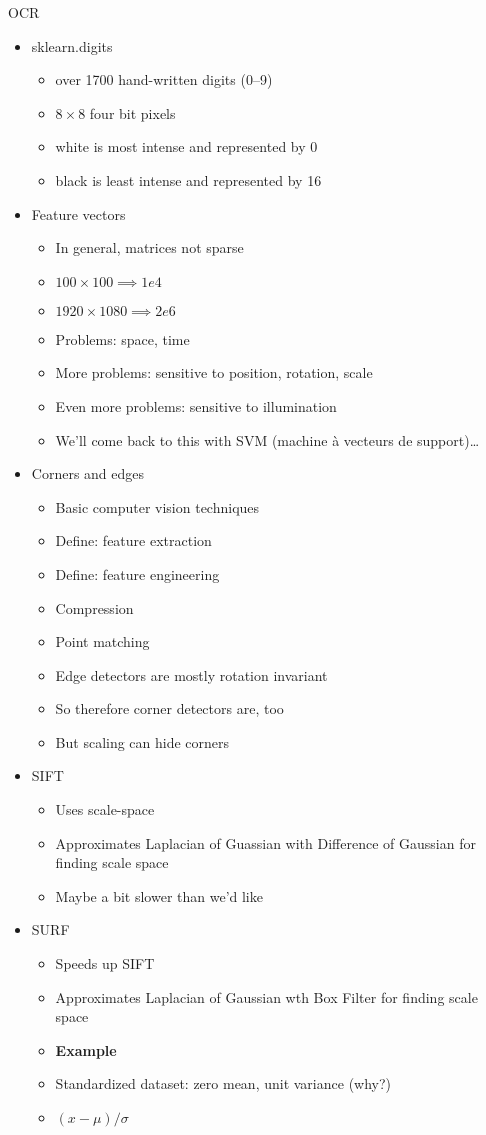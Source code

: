 \begin{itemize}
OCR
\begin{itemize}
\item sklearn.digits
  \begin{itemize}
  \item over 1700 hand-written digits (0--9)
  \item $8\times 8$ four bit pixels
  \item white is most intense and represented by 0
  \item black is least intense and represented by 16
  \end{itemize}
\item Feature vectors
  \begin{itemize}
  \item In general, matrices not sparse
  \item $100\times 100 \implies 1e4$
  \item $1920\times 1080 \implies 2e6$
  \item Problems: space, time
  \item More problems: sensitive to position, rotation, scale
  \item Even more problems: sensitive to illumination
  \item We'll come back to this with SVM (machine à vecteurs de support)\dots
  \end{itemize}
\item Corners and edges
  \begin{itemize}
  \item Basic computer vision techniques
  \item Define: feature extraction
  \item Define: feature engineering
  \item Compression
  \item Point matching
  \item Edge detectors are mostly rotation invariant
  \item So therefore corner detectors are, too
  \item But scaling can hide corners
  \end{itemize}
\item SIFT
  \begin{itemize}
  \item Uses scale-space
  \item Approximates Laplacian of Guassian with Difference of Gaussian for finding scale space
  \item Maybe a bit slower than we'd like
  \end{itemize}
\item SURF
  \begin{itemize}
  \item Speeds up SIFT
  \item Approximates Laplacian of Gaussian wth Box Filter for finding scale space
  \item \textbf{Example}
  \item Standardized dataset: zero mean, unit variance (why?)
  \item $(x-\mu)/\sigma$
  \end{itemize}
\end{itemize}
\end{itemize}


